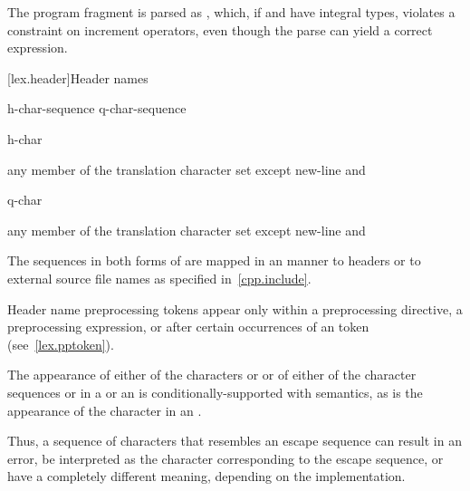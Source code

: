 \pnum
\begin{example}
The program fragment  is parsed as , which, if  and  have integral types,
violates a constraint on increment operators, even though the parse
 can yield a correct expression.
\end{example}

[lex.header]{Header names}

%
\begin{bnf}
\br
    \terminal{<} h-char-sequence \terminal{>}\br
     q-char-sequence 
\end{bnf}

\begin{bnf}
\br
    h-char 
\end{bnf}

\begin{bnf}
\br
    \textnormal{any member of the translation character set except new-line and }
\end{bnf}

\begin{bnf}
\br
    q-char 
\end{bnf}

\begin{bnf}
\br
    \textnormal{any member of the translation character set except new-line and }
\end{bnf}

\pnum
The sequences in both forms of  are mapped in an
 manner to headers or to
external source file names as specified in~\ref{cpp.include}.
\begin{note}
Header name preprocessing tokens appear only within
a  preprocessing directive,
a  preprocessing expression, or
after certain occurrences of an  token
(see~\ref{lex.pptoken}).
\end{note}

\pnum
The appearance of either of the characters  or \tcode{\textbackslash} or of
either of the character sequences \tcode{/*} or \tcode{//} in a
 or an 
is conditionally-supported with  semantics, as is the appearance of the character
 in an .
\begin{note}
Thus, a sequence of characters
that resembles an escape sequence can result in an error, be interpreted as the
character corresponding to the escape sequence, or have a completely different meaning,
depending on the implementation.
\end{note}


